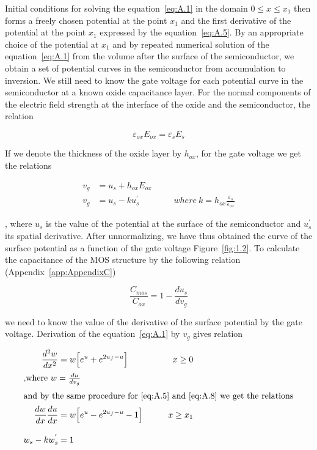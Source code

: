 Initial conditions for solving the equation~\ref{eq:A.1} in the domain
${0\leq{x}\leq{x_1}}$ then forms a freely chosen potential at the
point $x_1$ and the first derivative of the potential at the point
$x_1$ expressed by the equation~\ref{eq:A.5}. By an appropriate choice
of the potential at $x_1$ and by repeated numerical solution of the
equation~\ref{eq:A.1} from the volume after the surface of the
semiconductor, we obtain a set of potential curves in the
semiconductor from accumulation to inversion. We still need to know
the gate voltage for each potential curve in the semiconductor at a
known oxide capacitance layer.  For the normal components of the
electric field strength at the interface of the oxide and the
semiconductor, the relation

\begin{equation}\label{eq:A.6}
  \varepsilon_{ox}E_{ox} = \varepsilon_s{E_s}
\end{equation}

If we denote the thickness of the oxide layer by $h_{ox}$, for the
gate voltage we get the relations

\begin{align}
  v_g &= u_s + h_{ox}E_{ox} \label{eq:A.7} \\
  v_g &= u_s - ku_{s}^{'} \qquad\qquad where\ {k = h_{ox}\frac{\varepsilon_s}{\varepsilon_{ox}}} \label{eq:A.8}
\end{align}

, where $u_s$ is the value of the potential at the surface of the
semiconductor and $u_{s}^{'}$ its spatial derivative. After
unnormalizing, we have thus obtained the curve of the surface
potential as a function of the gate voltage Figure~\ref{fig:1.2}. To
calculate the capacitance of the MOS structure by the following
relation (Appendix~\ref{app:AppendixC})

\begin{equation}\label{eq:A.9}
  \frac{C_{mos}}{C_{ox}} = 1 - \frac{du_s}{dv_g}
\end{equation}

we need to know the value of the derivative of the surface potential
by the gate voltage. Derivation of the equation~\ref{eq:A.1} by $v_g$
gives relation

\begin{samepage}
  \begin{subequations}\label{eq:A.10}
    \begin{align}
      \frac{d^{2}w}{dx^2} &= w \Big[e^u + e^{2u_f-u}\Big] \qquad &{x\ge{0}} \label{eq:A.10a} \\
      \intertext{,where $w=\frac{du}{dv_g}$}
      \intertext{and by the same procedure for~\ref{eq:A.5} and~\ref{eq:A.8} we get the relations}
      \frac{dw}{dx}\frac{du}{dx} &= w \Big[e^u - e^{2u_f-u} - 1\Big] \qquad &{x\ge{x_1}} \label{eq:A.10b} \\[0.3cm]
      w_s - kw_s^{'} &= 1 \label{eq:A.10c}
    \end{align}
  \end{subequations}
\end{samepage}

